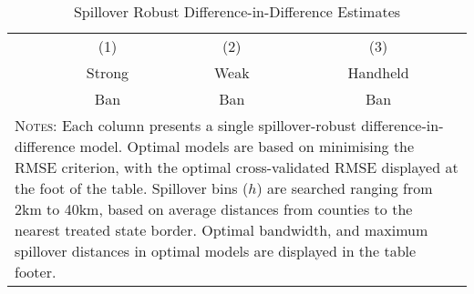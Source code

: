 \documentclass[12pt]{article}
\begin{document}
\begin{spacing}{1.3}
\begin{table}
  \begin{center}
    \caption{Reform and Spillover Effects: Bins in 10km}
  \end{center}
\end{table}
\thispagestyle{empty}


\begin{table}
  \begin{center}
    \caption{Spillover Robust Difference-in-Difference Estimates}
    \begin{tabular}{lccc}
      \toprule
      &(1)&(2)&(3)\\ 
      &Strong & Weak & Handheld \\
      &Ban&Ban&Ban \\ \midrule
      
      \bottomrule
      \multicolumn{4}{p{13.3cm}}{{\footnotesize \textsc{Notes}: Each
          column presents a single spillover-robust
          difference-in-difference model.  Optimal models are
          based on minimising the RMSE criterion, with the optimal
          cross-validated RMSE displayed at the foot of the table.
          Spillover bins ($h$) are searched ranging from 2km to 40km,
          based on average distances from counties to the nearest
          treated state border. Optimal bandwidth, and maximum spillover
          distances in optimal models are displayed in the table footer.}}
    \end{tabular}
  \end{center}
\end{table}
\clearpage


\end{spacing}
\end{document}
